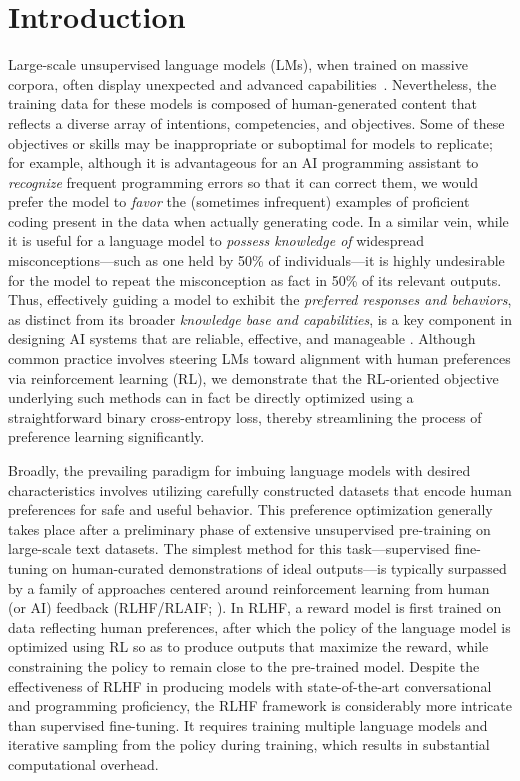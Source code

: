 \section{Introduction}
Large-scale unsupervised language models (LMs), when trained on massive corpora, often display unexpected and advanced capabilities~\citep{chowdhery2022palm, brown2020language, touvron2023llama,bubeck2023sparks}. Nevertheless, the training data for these models is composed of human-generated content that reflects a diverse array of intentions, competencies, and objectives. Some of these objectives or skills may be inappropriate or suboptimal for models to replicate; for example, although it is advantageous for an AI programming assistant to \textit{recognize} frequent programming errors so that it can correct them, we would prefer the model to \emph{favor} the (sometimes infrequent) examples of proficient coding present in the data when actually generating code. In a similar vein, while it is useful for a language model to \textit{possess knowledge of} widespread misconceptions—such as one held by 50\% of individuals—it is highly undesirable for the model to repeat the misconception as fact in 50\% of its relevant outputs. Thus, effectively guiding a model to exhibit the \emph{preferred responses and behaviors}, as distinct from its broader \textit{knowledge base and capabilities}, is a key component in designing AI systems that are reliable, effective, and manageable \citep{ouyang2022training}. Although common practice involves steering LMs toward alignment with human preferences via reinforcement learning (RL), we demonstrate that the RL-oriented objective underlying such methods can in fact be directly optimized using a straightforward binary cross-entropy loss, thereby streamlining the process of preference learning significantly.

Broadly, the prevailing paradigm for imbuing language models with desired characteristics involves utilizing carefully constructed datasets that encode human preferences for safe and useful behavior. This preference optimization generally takes place after a preliminary phase of extensive unsupervised pre-training on large-scale text datasets. The simplest method for this task—supervised fine-tuning on human-curated demonstrations of ideal outputs—is typically surpassed by a family of approaches centered around reinforcement learning from human (or AI) feedback (RLHF/RLAIF; \citep{christiano2017deep,bai2022constitutional}). In RLHF, a reward model is first trained on data reflecting human preferences, after which the policy of the language model is optimized using RL so as to produce outputs that maximize the reward, while constraining the policy to remain close to the pre-trained model. Despite the effectiveness of RLHF in producing models with state-of-the-art conversational and programming proficiency, the RLHF framework is considerably more intricate than supervised fine-tuning. It requires training multiple language models and iterative sampling from the policy during training, which results in substantial computational overhead.

